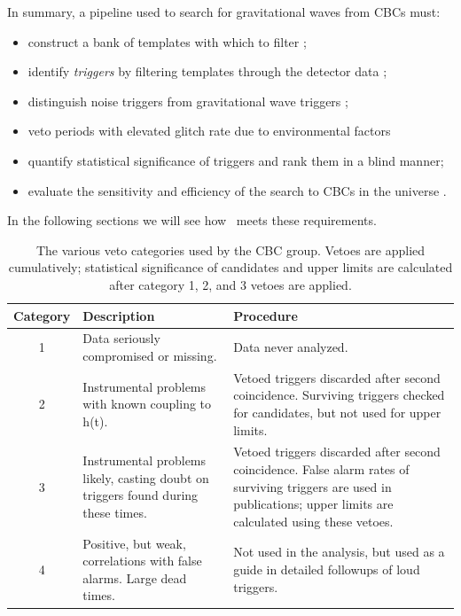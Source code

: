 In summary, a pipeline used to search for gravitational waves from \ac{CBC}s must:
\begin{itemize}
\item{construct a bank of templates with which to filter \cite{Owen:1998dk, Tanaka:2000, BBCCS:2006, hexabank};}
\item{identify \emph{triggers} by filtering templates through the detector data \cite{Brown};}
\item{distinguish noise triggers from gravitational wave triggers \cite{Allen:2004};}
\item{veto periods with elevated glitch rate due to environmental factors \cite{Slutsky:2010ff, Christensen:2010}}
\item{quantify statistical significance of triggers and rank them in a blind manner;}
\item{evaluate the sensitivity and efficiency of the search to \ac{CBC}s in the universe \cite{Collaboration:2009tt, Abbott:2009qj, Collaboration:S6CBClowmass}.}
\end{itemize}
In the following sections we will see how \ihope~meets these requirements.

\begin{table}
\label{tab:veto_cats}
\center
\begin{tabular}{c | p{5cm} | p{8cm}}
Category    &    Description    &   Procedure    \\
\hline
    1       &    Data seriously compromised or missing.    &    Data never analyzed. \\
\hline
    2       &    Instrumental problems with known coupling to h(t).    &    Vetoed triggers discarded after second coincidence. Surviving triggers checked for candidates, but not used for upper limits. \\
\hline
    3       &    Instrumental problems likely, casting doubt on triggers found during these times.    &    Vetoed triggers discarded after second coincidence. False alarm rates of surviving triggers are used in publications; upper limits are calculated using these vetoes.  \\
\hline
    4       &    Positive, but weak, correlations with false alarms. Large dead times.    &     Not used in the analysis, but used as a guide in detailed followups of loud triggers. \\
\end{tabular}

\caption{The various veto categories used by the CBC group. Vetoes are applied cumulatively; statistical significance of candidates and upper limits are calculated after category 1, 2, and 3 vetoes are applied.}
\end{table}

